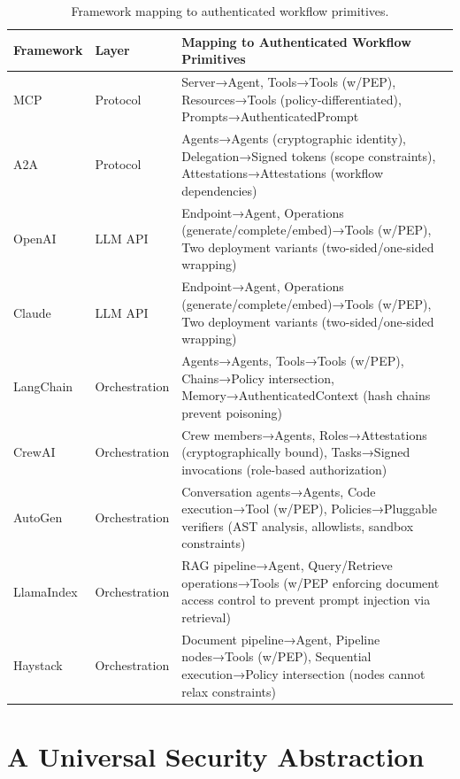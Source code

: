 
\begin{table}[t!]
\centering
\scriptsize
\begin{tabular}{llp{11cm}}
\toprule
\textbf{Framework} & \textbf{Layer} & \textbf{Mapping to Authenticated Workflow Primitives} \\
\midrule
MCP & Protocol & Server→Agent, Tools→Tools (w/PEP), Resources→Tools (policy-differentiated), Prompts→AuthenticatedPrompt \\
A2A & Protocol & Agents→Agents (cryptographic identity), Delegation→Signed tokens (scope constraints), Attestations→Attestations (workflow dependencies) \\
OpenAI & LLM API & Endpoint→Agent, Operations (generate/complete/embed)→Tools (w/PEP), Two deployment variants (two-sided/one-sided wrapping) \\
Claude & LLM API & Endpoint→Agent, Operations (generate/complete/embed)→Tools (w/PEP), Two deployment variants (two-sided/one-sided wrapping) \\
LangChain & Orchestration & Agents→Agents, Tools→Tools (w/PEP), Chains→Policy intersection, Memory→AuthenticatedContext (hash chains prevent poisoning) \\
CrewAI & Orchestration & Crew members→Agents, Roles→Attestations (cryptographically bound), Tasks→Signed invocations (role-based authorization) \\
AutoGen & Orchestration & Conversation agents→Agents, Code execution→Tool (w/PEP), Policies→Pluggable verifiers (AST analysis, allowlists, sandbox constraints) \\
LlamaIndex & Orchestration & RAG pipeline→Agent, Query/Retrieve operations→Tools (w/PEP enforcing document access control to prevent prompt injection via retrieval) \\
Haystack & Orchestration & Document pipeline→Agent, Pipeline nodes→Tools (w/PEP), Sequential execution→Policy intersection (nodes cannot relax constraints) \\
\bottomrule
\end{tabular}
\caption{Framework mapping to authenticated workflow primitives.}
\label{tab:framework-mapping}
\end{table}

\section{A Universal Security Abstraction}
\label{sec:enforcement}



